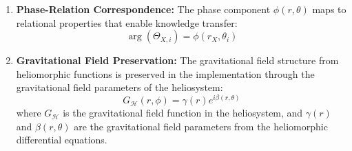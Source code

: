 \begin{theorem}
\begin{enumerate}
    \item \textbf{Phase-Relation Correspondence:} The phase component $\phi(r,\theta)$ maps to relational properties that enable knowledge transfer:
    \begin{equation}
        \arg(\Theta_{X,i}) = \phi(r_X, \theta_i)
    \end{equation}
    
    \item \textbf{Gravitational Field Preservation:} The gravitational field structure from heliomorphic functions is preserved in the implementation through the gravitational field parameters of the heliosystem:
    \begin{equation}
        G_{\mathcal{H}}(r, \phi) = \gamma(r)e^{i\beta(r,\theta)}
    \end{equation}
    where $G_{\mathcal{H}}$ is the gravitational field function in the heliosystem, and $\gamma(r)$ and $\beta(r,\theta)$ are the gravitational field parameters from the heliomorphic differential equations.
\end{enumerate}
\end{theorem}

